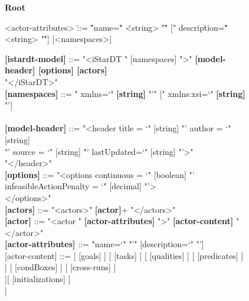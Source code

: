 \begin{figure}[p]
\begin{tcolorbox}[title=iStar-DT-X Grammar,colbacktitle=orange!40!white,coltitle=black,fonttitle=\bfseries,adjusted title=iStarDT-X Grammar (2/3),halign title=flush center]

\rmfamily
\begin{footnotesize}
\textbf{Root}
\end{footnotesize}
\ttfamily
\begin{scriptsize}
\begin{tabbing}
<actor-attributes> \= ::= \= "name=\"" \= <string> "\"" [" description=\"" <string> "\""] [<namespaces>]\kill


\textbf{[istardt-model]} \> ::= \> "<iStarDT " [namespaces] ">" \textbf{[model-header] [options] [actors]} \\ \>\> "</iStarDT>" \\
\textbf{[namespaces]} \> ::= " xmlns=`" \textbf{[string]} "'" [" xmlns:xsi=`" \textbf{[string]} "'] \\ \>\>[" xsi:schemaLocation= `" \textbf{[string]} "'"]\\
\textbf{[model-header]} \> ::= \>  "<header title = `" [string] "' author = `" [string] \\\>\> "' source = `" [string] "' lastUpdated=`" [string] "'>" \\\>\> [string] "</header>"\\
\textbf{[options]} \> ::= \>  "<options continuous = `" [boolean] "' \\\>\> infeasibleActionPenalty = `" [decimal] "'>\\\>\> </options>"\\
\textbf{[actors]} \> ::= \> "<actors>" \textbf{[actor]}+ "</actors>"\\
\textbf{[actor]} \> ::= "<actor " \textbf{[actor-attributes]} ">" \textbf{[actor-content]} "</actor>"\\
\textbf{[actor-attributes]} \> ::= "name=`" \red{[identifier]} "'" [description=`" \red{[string]} "'] \\
{}[actor-content] \> ::=  [ [goals] ] [ [tasks] ] [ [qualities] ] [ [predicates] ] \\ 
\> \> [ [variables] ] [ [condBoxes] ] [ [cross-runs] ]\\ 
\> \> [ [exported-set] ][ [initializations] ] \red{[ \textbf{[definitions]} ]}\\
\> \> [ [invars] ]\\
\end{tabbing}




\end{scriptsize}
\end{tcolorbox}
\end{figure}
